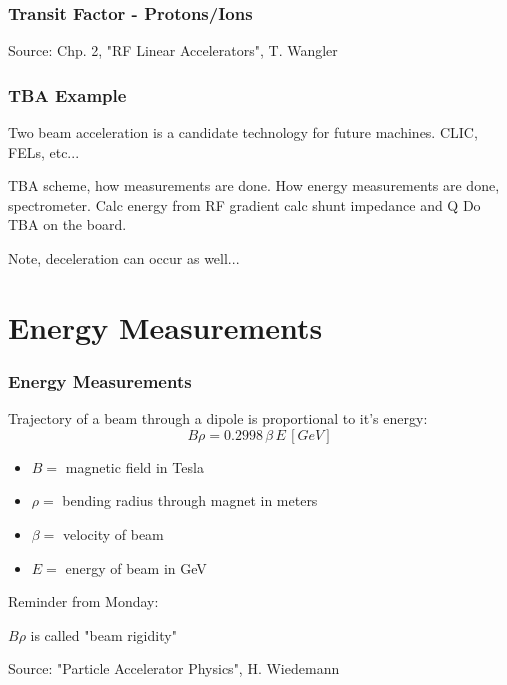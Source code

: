 \documentclass[professionalfonts,t]{beamer}
\begin{document}
\begin{frame}
\frametitle{Transit Factor - Protons/Ions}
\vspace{1em}
Source: Chp. 2, "RF Linear Accelerators", T. Wangler
\end{frame}

\begin{frame}
	\frametitle{TBA Example}

	
	Two beam acceleration is a candidate technology for future machines.
	CLIC, FELs, etc...
	
	TBA scheme, how measurements are done. 
How energy measurements are done, spectrometer.
Calc energy from RF gradient
calc shunt impedance and Q
Do TBA on the board.	

	Note, deceleration can occur as well...
	
\end{frame}



\section{Energy Measurements}
\begin{frame}
	\frametitle{Energy Measurements}
	Trajectory of a beam through a dipole is proportional to it's energy:
	\begin{equation}
		B \rho = 0.2998 \, \beta \, E \, [GeV]
	\end{equation}
	\begin{itemize}
		\item $B = $ magnetic field in Tesla
		\item $\rho =$ bending radius through magnet in meters
		\item $\beta =$ velocity of beam
		\item $E = $ energy of beam in GeV 
	\end{itemize}

\vspace{1em}
Reminder from Monday:

$B\rho$ is called "beam rigidity"

\vspace{1em}
Source: "Particle Accelerator Physics", H. Wiedemann
\end{frame}
\end{document}
